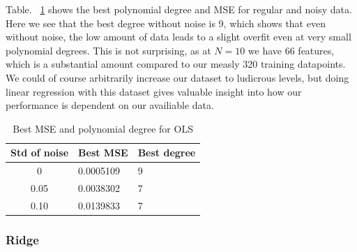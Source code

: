 \documentclass[twocolumn,10pt,cleanfoot]{asme2ej}
\begin{document}

Table. ~\ref{ols_mse_table} shows the best polynomial degree and MSE for regular and noisy data. Here we see that the best degree without noise is 9, which shows that even without noise, the low amount of data leads to a slight overfit even at very small polynomial degrees. This is not surprising, as at $N = 10$ we have $66$ features, which is a substantial amount compared to our measly 320 training datapoints. We could of course arbitrarily increase our dataset to ludicrous levels, but doing linear regression with this dataset gives valuable insight into how our performance is dependent on our availiable data.

\begin{table}[t]
\caption{Best MSE and polynomial degree for OLS}
\begin{center}
\label{ols_mse_table}
\begin{tabular}{c l l}
Std of noise & Best MSE & Best degree \\
\hline
0 & 0.0005109 & 9\\
0.05 & 0.0038302 & 7 \\
0.10 & 0.0139833 & 7 \\
\hline
\end{tabular}
\end{center}
\end{table}

\subsubsection{Ridge}
\end{document}
